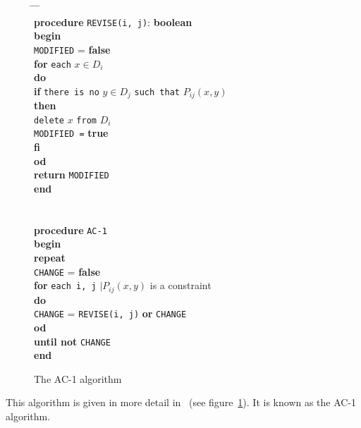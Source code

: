 \documentclass[a4paper,11pt]{article}
\begin{document}
\begin{figure}[htbp]
\begin{center}
\begin{tabbing}
\hspace{3cm} \= \hspace{1cm} \= \hspace{1cm} \= \hspace{1cm} \= \\
\> {\bf procedure} {\tt REVISE(i, j)}: {\bf boolean} \\
\> {\bf begin} \\
\> \> {\tt MODIFIED} = {\bf false} \\
\> \> {\bf for} {\tt each} $x \in D_i$ \\
\> \> {\bf do} \\
\> \> \> {\bf if} {\tt there is no} $y \in D_j$
{\tt such that} $P_{ij}(x, y)$ \\
\> \> \> {\bf then} \\
\> \> \> \> {\tt delete} $x$ {\tt from} $D_i$ \\
\> \> \> \> {\tt MODIFIED =} {\bf true} \\
\> \> \> {\bf fi} \\
\> \> {\bf od} \\
\> \> {\bf return} {\tt MODIFIED} \\
\> {\bf end} \\
\\ \\ 
\> {\bf procedure} {\tt AC-1} \\
\> {\bf begin} \\
\> \> {\bf repeat} \\
\> \> \> {\tt CHANGE} = {\bf false} \\
\> \> \> {\bf for} {\tt each i, j} $\mid P_{ij}(x, y)$ is a constraint \\
\> \> \> {\bf do} \\
\> \> \> \> {\tt CHANGE} = {\tt REVISE(i, j)} {\bf or} {\tt CHANGE} \\
\> \> \> {\bf od} \\
\> \> {\bf until not} {\tt CHANGE} \\
\> {\bf end}
\end{tabbing}
\caption{The AC-1 algorithm}
\label{fig:ac-1}
\end{center}
\end{figure}
This algorithm is given in more detail in~\cite{ai:mack}
(see figure~\ref{fig:ac-1}). It is known as the AC-1 algorithm.
\end{document}
